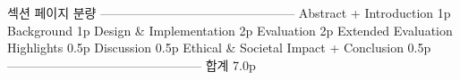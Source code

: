 

섹션                     페이지 분량
-----------------------------------------------
Abstract + Introduction	1p
Background	            1p
Design & Implementation	2p
Evaluation	            2p
Extended Evaluation Highlights      	0.5p
Discussion                          	0.5p
Ethical & Societal Impact + Conclusion	0.5p
-----------------------------------------------
합계                                     7.0p
